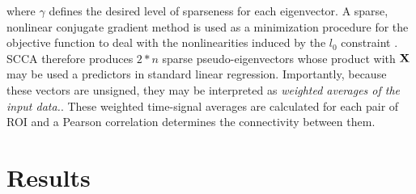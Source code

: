 \documentclass{llncs}
\newcommand{\X}{{\bf X}}
\newcommand{\vv}{{\bf v}}
\begin{document}
where $\gamma$ defines the desired level of sparseness for each eigenvector. A sparse, nonlinear conjugate gradient method is used as a minimization procedure for the objective function to deal with the nonlinearities induced by the $l_0$ constraint \cite{anon}. SCCA therefore produces $2*n$ sparse pseudo-eigenvectors whose product with $\X$ may be used a predictors in standard linear regression.  Importantly, because these vectors are unsigned, they may be interpreted as {\em weighted averages of the input data.}. These weighted time-signal averages are calculated for each pair of ROI and a Pearson correlation determines the connectivity between them.



\section{Results}
\end{document}
